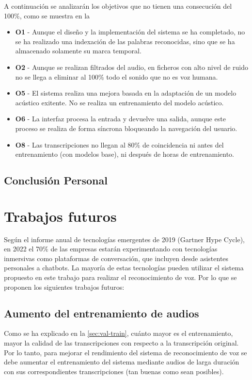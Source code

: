 \documentclass[../main.tex]{subfiles}
\begin{document}
A continuación se analizarán los objetivos que no tienen una consecución del 100\%, como se muestra en la 
\begin{itemize}
    \item \textbf{O1} - Aunque el diseño y la implementación del sistema se ha completado, no se ha realizado una indexación de las palabras reconocidas, sino que se ha almacenado solamente su marca temporal.
    \item \textbf{O2} - Aunque se realizan filtrados del audio, en ficheros con alto nivel de ruido no se llega a eliminar al 100\% todo el sonido que no es voz humana.
    \item \textbf{O5} - El sistema realiza una mejora basada en la adaptación de un modelo acústico exitente. No se realiza un entrenamiento del modelo acústico.
    \item \textbf{O6} - La interfaz procesa la entrada y devuelve una salida, aunque este proceso se realiza de forma síncrona bloqueando la navegación del usuario.
    \item \textbf{O8} - Las transcripciones no llegan al 80\% de coincidencia ni antes del entrenamiento (con modelos base), ni después de horas de entrenamiento.
\end{itemize}

\subsection{Conclusión Personal}


\section{Trabajos futuros}\label{sec:trabajos_futuros}
Según el informe anual de tecnologías emergentes de 2019 (Gartner Hype Cycle)\cite{Gartner2018}, en 2022 el 70\% de las empresas estarán experimentando con tecnologías inmersivas como plataformas de conversación, que incluyen desde  asistentes personales a chatbots. La mayoría de estas tecnologías pueden utilizar el sistema propuesto en este trabajo para realizar el reconocimiento de voz. Por lo que se proponen los siguientes trabajos futuros:

\subsection{Aumento del entrenamiento de audios}
Como se ha explicado en la \autoref{sec:val-train}, cuánto mayor es el entrenamiento, mayor la calidad de las transcripciones con respecto a la transcripción original. Por lo tanto, para mejorar el rendimiento del sistema de reconocimiento de voz se debe aumentar el entrenamiento del sistema mediante audios de larga duración con sus correspondientes transcripciones (tan buenas como sean posibles).
\end{document}
